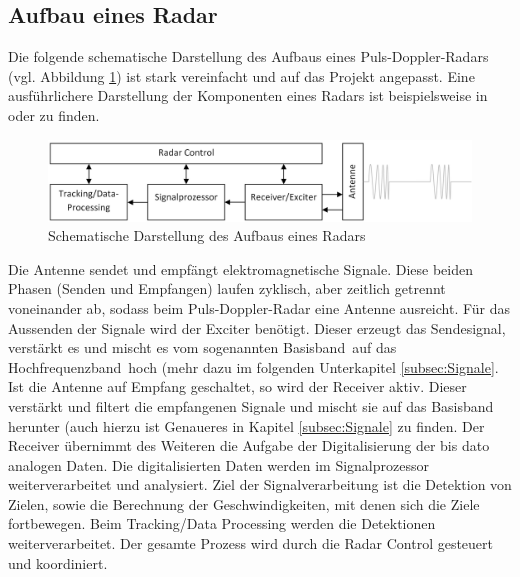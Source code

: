 \subsection{Aufbau eines Radar}

Die folgende schematische Darstellung des Aufbaus eines Puls-Doppler-Radars (vgl. Abbildung \ref{fig:Aufbau}) ist stark vereinfacht und auf das Projekt angepasst. Eine ausführlichere Darstellung der Komponenten eines Radars ist beispielsweise in \cite[Abschnitt 1.4]{Ludloff} oder \cite[Abschnitt 1.3]{Richards} zu finden. 

\begin{figure}[h] 
  \centering
  \includegraphics[scale=0.4]{images/Radar_Aufbau_Zoom240.PNG}
  \caption{Schematische Darstellung des Aufbaus eines Radars}
  \label{fig:Aufbau}
\end{figure}

Die Antenne sendet und empfängt elektromagnetische Signale. Diese beiden Phasen (Senden und Empfangen) laufen zyklisch, aber zeitlich getrennt voneinander ab, sodass beim Puls-Doppler-Radar eine Antenne ausreicht. Für das Aussenden der Signale wird der Exciter benötigt. Dieser erzeugt das Sendesignal, verstärkt es und mischt es vom sogenannten \glqq Basisband\grqq ~auf das \glqq Hochfrequenzband\grqq ~hoch (mehr dazu im folgenden Unterkapitel \ref{subsec:Signale}. Ist die Antenne auf Empfang geschaltet, so wird der Receiver aktiv. Dieser verstärkt und filtert  die empfangenen Signale und mischt sie auf das Basisband herunter (auch hierzu ist Genaueres in Kapitel \ref{subsec:Signale} zu finden. Der Receiver übernimmt des Weiteren die Aufgabe der Digitalisierung der bis dato analogen Daten. Die digitalisierten Daten werden im Signalprozessor weiterverarbeitet und analysiert. Ziel der Signalverarbeitung ist die Detektion von Zielen, sowie die Berechnung der Geschwindigkeiten, mit denen sich die Ziele fortbewegen. Beim Tracking/Data Processing werden die Detektionen weiterverarbeitet. Der gesamte Prozess wird durch die Radar Control gesteuert und koordiniert.